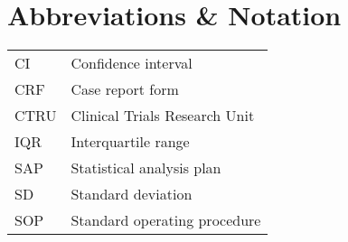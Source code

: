 \section*{Abbreviations \& Notation}
\begin{tabular}{ll}
CI & Confidence interval\\
CRF & Case report form\\
CTRU & Clinical Trials Research Unit\\
IQR & Interquartile range\\
SAP & Statistical analysis plan\\
SD & Standard deviation\\
SOP & Standard operating procedure\\
\end{tabular}
